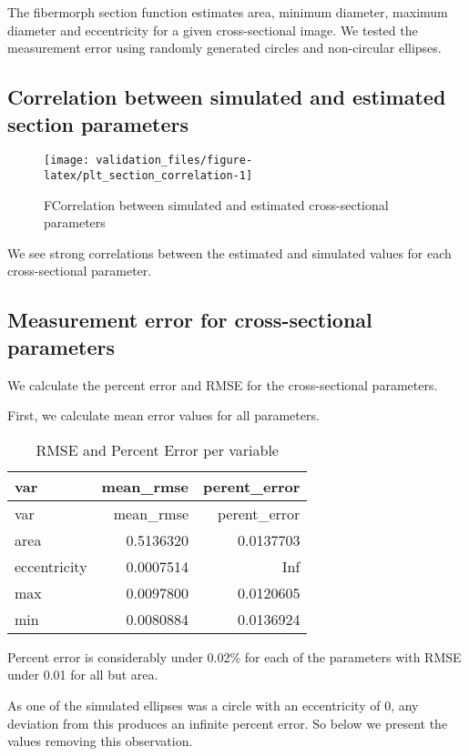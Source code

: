\documentclass[
]{article}
\begin{document}
The fibermorph section function estimates area, minimum diameter,
maximum diameter and eccentricity for a given cross-sectional image. We
tested the measurement error using randomly generated circles and
non-circular ellipses.

\hypertarget{correlation-between-simulated-and-estimated-section-parameters}{%
\subsection{Correlation between simulated and estimated section
parameters}\label{correlation-between-simulated-and-estimated-section-parameters}}

\begin{figure}
\texttt{[image: validation\_files/figure-latex/plt\_section\_correlation-1]} \caption{FCorrelation between simulated and estimated cross-sectional parameters}\label{fig:plt_section_correlation}
\end{figure}

We see strong correlations between the estimated and simulated values
for each cross-sectional parameter.

\hypertarget{measurement-error-for-cross-sectional-parameters}{%
\subsection{Measurement error for cross-sectional
parameters}\label{measurement-error-for-cross-sectional-parameters}}

We calculate the percent error and RMSE for the cross-sectional
parameters.

First, we calculate mean error values for all parameters.

\begin{longtable}[]{@{}lrr@{}}
\caption{RMSE and Percent Error per variable}\tabularnewline
\toprule
var & mean\_rmse & perent\_error\tabularnewline
\midrule
\endfirsthead
\toprule
var & mean\_rmse & perent\_error\tabularnewline
\midrule
\endhead
area & 0.5136320 & 0.0137703\tabularnewline
eccentricity & 0.0007514 & Inf\tabularnewline
max & 0.0097800 & 0.0120605\tabularnewline
min & 0.0080884 & 0.0136924\tabularnewline
\bottomrule
\end{longtable}

Percent error is considerably under 0.02\% for each of the parameters
with RMSE under 0.01 for all but area.

As one of the simulated ellipses was a circle with an eccentricity of 0,
any deviation from this produces an infinite percent error. So below we
present the values removing this observation.
\end{document}
